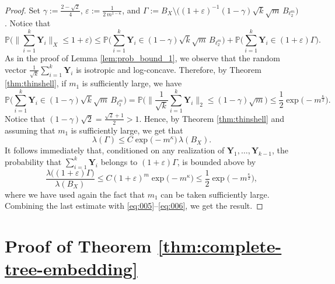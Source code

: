 \documentclass[11pt,leqno]{amsart}
\theoremstyle{remark}
\theoremstyle{plain}
\begin{document}
\begin{proof}
Set $\gamma := \frac{2-\sqrt2}{4}$, $\varepsilon:=\frac{1}{2\,m^{1-\kappa}}$, and
$\Gamma:= B_X\setminus \Big((1+\varepsilon)^{-1}(1-\gamma)\sqrt{k}\sqrt{m}\, B_{\ell_2^m}\Big)$. Notice that
\begin{equation}\label{eq:005}
\mathbb{P}\Bigg( \Big\| \sum_{i=1}^{k} \mathbf{Y}_i \Big\|_X \leqslant 1+\varepsilon \Bigg) \leqslant
\mathbb{P}\Big( \sum_{i=1}^{k} \mathbf{Y}_i \in (1-\gamma)\sqrt{k}\sqrt{m}\,B_{\ell^m_2} \Big) +
\mathbb{P}\Big(\sum_{i=1}^{k} \mathbf{Y}_i \in (1+\varepsilon)\Gamma\Big).
\end{equation}
As in the proof of Lemma \ref{lem:prob_bound_1}, we observe that the random vector $\frac{1}{\sqrt{k}} \sum_{i=1}^{k} \mathbf{Y}_i $ is isotropic and log-concave. Therefore, by Theorem \ref{thm:thinshell}, if $m_1$ is sufficiently large, we have
\begin{equation} \label{eq:006}
\mathbb{P}\Bigg(\sum_{i=1}^{k} \mathbf{Y}_i \in (1-\gamma)\sqrt{k}\sqrt{m}\,B_{\ell_2^m} \Bigg) =
\mathbb{P}\Bigg(\Big\|\frac{1}{\sqrt{k}}\sum_{i=1}^{k} \mathbf{Y}_i \Big\|_2\leqslant (1-\gamma)\sqrt{m} \Bigg)
\leqslant \frac{1}{2}\exp\big(-m^{\frac{\kappa}{2}}\big).
\end{equation}
Notice that
$(1-\gamma)\sqrt{2}=\frac{\sqrt{2}+1}{2}>1$.
Hence, by Theorem \ref{thm:thinshell} and assuming that $m_1$ is sufficiently large, we get that
$$ \lambda(\Gamma) \leqslant C\exp\big(-m^{\kappa}\big)\,\lambda(B_X). $$
It follows immediately that, conditioned on any realization of $\mathbf{Y}_1,\dots,\mathbf{Y}_{k-1}$, the probability that $\sum_{i=1}^{k} \mathbf{Y}_i$ belongs to $(1+\varepsilon)\Gamma$, is bounded above by
$$ \frac{\lambda\big((1+\varepsilon)\Gamma\big)}{\lambda(B_X)} \leqslant
C(1+\varepsilon)^m\exp\big(-m^{\kappa}\big) \leqslant \frac{1}{2}\exp\big(-m^{\frac{\kappa}{2}}\big), $$
where we have used again the fact that $m_1$ can be taken sufficiently large. Combining the last estimate with \eqref{eq:005}--\eqref{eq:006}, we get the result.
\end{proof}

\section{Proof of Theorem \ref{thm:complete-tree-embedding}} \label{sec4}
\end{document}
